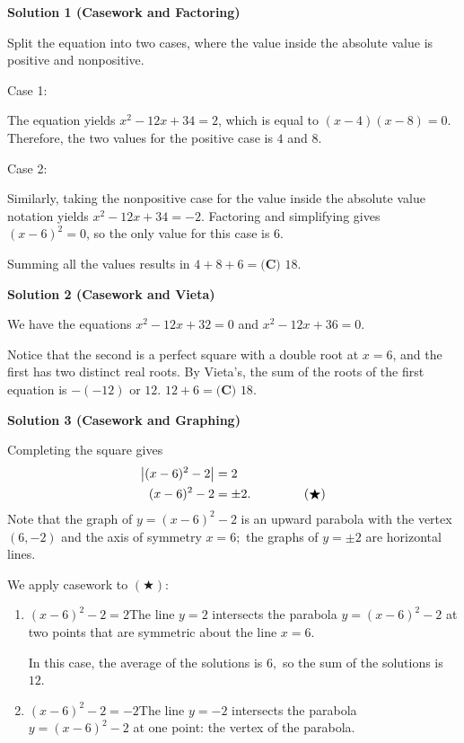 \begin{enumerate}
\textbf{Solution 1 (Casework and Factoring)}

Split the equation into two cases, where the value inside the absolute value is positive and nonpositive.

 Case 1:

 The equation yields $x^2-12x+34=2$, which is equal to $(x-4)(x-8)=0$. Therefore, the two values for the positive case is $4$ and $8$.

 Case 2:

 Similarly, taking the nonpositive case for the value inside the absolute value notation yields $x^2-12x+34=-2$. Factoring and simplifying gives $(x-6)^2=0$, so the only value for this case is $6$.

 Summing all the values results in $4+8+6=\boxed{\textbf{(C) }18}$.

 



\textbf{Solution 2 (Casework and Vieta)}

We have the equations $x^2-12x+32=0$ and $x^2-12x+36=0$.

 Notice that the second is a perfect square with a double root at $x=6$, and the first has two distinct real roots. By Vieta's, the sum of the roots of the first equation is $-(-12)$ or $12$. $12+6=\boxed{\textbf{(C) }18}$.

 



\textbf{Solution 3 (Casework and Graphing)}

Completing the square gives
 \begin{align*} \left|(x-6)^2-2\right|&=2 \\ (x-6)^2-2&=\pm2. \hspace{15mm}(\bigstar) \end{align*}
Note that the graph of $y=(x-6)^2-2$ is an upward parabola with the vertex $(6,-2)$ and the axis of symmetry $x=6;$ the graphs of $y=\pm2$ are horizontal lines.

 We apply casework to $(\bigstar):$

            \begin{enumerate} 
        \item $(x-6)^2-2=2$The line $y=2$ intersects the parabola $y=(x-6)^2-2$ at two points that are symmetric about the line $x=6.$

 In this case, the average of the solutions is $6,$ so the sum of the solutions is $12.$

        \item $(x-6)^2-2=-2$The line $y=-2$ intersects the parabola $y=(x-6)^2-2$ at one point: the vertex of the parabola.


\end{enumerate}
\end{enumerate}
